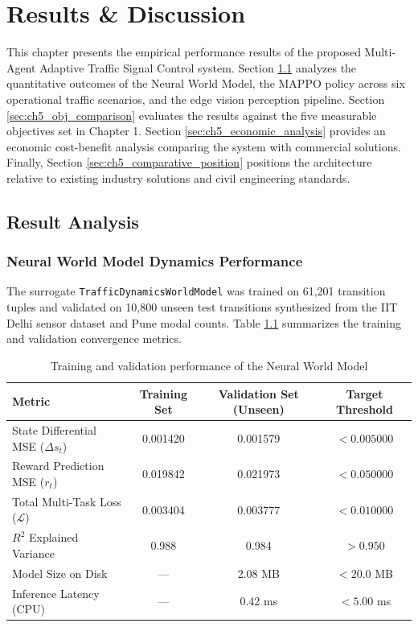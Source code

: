 \chapter{Results \& Discussion}
\label{ch:results_discussion}

This chapter presents the empirical performance results of the proposed Multi-Agent Adaptive Traffic Signal Control system. Section \ref{sec:ch5_result_analysis} analyzes the quantitative outcomes of the Neural World Model, the MAPPO policy across six operational traffic scenarios, and the edge vision perception pipeline. Section \ref{sec:ch5_obj_comparison} evaluates the results against the five measurable objectives set in Chapter 1. Section \ref{sec:ch5_economic_analysis} provides an economic cost-benefit analysis comparing the system with commercial solutions. Finally, Section \ref{sec:ch5_comparative_position} positions the architecture relative to existing industry solutions and civil engineering standards.

\section{Result Analysis}
\label{sec:ch5_result_analysis}

\subsection{Neural World Model Dynamics Performance}
The surrogate \texttt{TrafficDynamicsWorldModel} was trained on 61,201 transition tuples and validated on 10,800 unseen test transitions synthesized from the IIT Delhi sensor dataset and Pune modal counts. Table \ref{tab:ch5_world_model_perf} summarizes the training and validation convergence metrics.

\begin{table}[htbp]
\centering
\small
\caption{Training and validation performance of the Neural World Model}
\label{tab:ch5_world_model_perf}
\begin{tabularx}{\textwidth}{|X|c|c|c|}
\hline
\textbf{Metric} & \textbf{Training Set} & \textbf{Validation Set (Unseen)} & \textbf{Target Threshold} \\ \hline
State Differential MSE ($\Delta s_t$) & 0.001420 & 0.001579 & $< 0.005000$ \\ \hline
Reward Prediction MSE ($r_t$) & 0.019842 & 0.021973 & $< 0.050000$ \\ \hline
Total Multi-Task Loss ($\mathcal{L}$) & 0.003404 & 0.003777 & $< 0.010000$ \\ \hline
$R^2$ Explained Variance & 0.988 & 0.984 & $> 0.950$ \\ \hline
Model Size on Disk & --- & 2.08 MB & $< 20.0$ MB \\ \hline
Inference Latency (CPU) & --- & 0.42 ms & $< 5.00$ ms \\ \hline
\end{tabularx}
\end{table}

